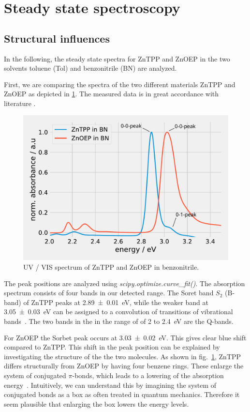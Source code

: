\section{Steady state spectroscopy}
\label{sec:SSS}

\subsection{Structural influences}

In the following, the steady state spectra for ZnTPP and ZnOEP in the two solvents toluene (Tol) and benzonitrile (BN) are analyzed.

First, we are comparing the spectra of the two different materials ZnTPP and ZnOEP as depicted in \cref{fig:ZnTPPZnOEP}. The measured data is in great accordance with 
literature \cite{Wagner.1994}.
\begin{figure}[h]
    \centering
    \includegraphics[width = 12cm]{Program/ZnTPPZnOEP.pdf}
    \caption{UV / VIS spectrum of ZnTPP and ZnOEP in benzonitrile.}
    \label{fig:ZnTPPZnOEP}
\end{figure}
The peak positions are analyzed using \textit{scipy.optimize.curve\_fit()}. The absorption spectrum consists of four bands in our detected range. The Soret band $S_\mathrm{2}$ (B-band) of ZnTPP peaks at 
\SI{2.89 \pm 0.01}{\eV}, while the weaker band at \SI{3.05\pm0.03}{\eV} can be assigned to a convolution of transitions of vibrational bands~\cite{Even.1982}.
The two bands in the in the range of of 2 to \SI{2.4}{\eV} are the Q-bands. 

For ZnOEP the Sorbet peak occurs at \SI{3.03\pm 0.02}{\eV}. This gives clear blue shift compared to ZnTPP.
This shift in the peak position can be explained by investigating the structure of the the two molecules. As shown in fig.~\ref{fig:ZnTPPZnOEP}, ZnTPP differs structurally from ZnOEP by having four benzene rings.
These enlarge the system of conjugated $\pi$-bonds, which leads to a lowering of the absorption energy~\cite{Kohler.2015}. Intuitively, we can
understand this by imagining the system of conjugated bonds as a box as often treated in quantum mechanics.
Therefore it seem plausible that enlarging the box lowers the energy levels.

